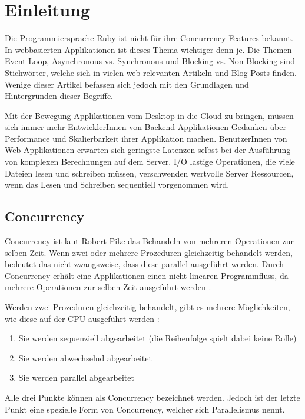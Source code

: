 \section{Einleitung}
\label{section:Einleitung}

Die Programmiersprache Ruby ist nicht für ihre Concurrency Features bekannt. In webbasierten Applikationen ist dieses Thema wichtiger denn je. Die Themen Event Loop, Asynchronous vs. Synchronous und Blocking vs. Non-Blocking sind Stichwörter, welche sich in vielen web-relevanten Artikeln und Blog Posts finden. Wenige dieser Artikel befassen sich jedoch mit den Grundlagen und Hintergründen dieser Begriffe. 

Mit der Bewegung Applikationen vom Desktop in die Cloud zu bringen, müssen sich immer mehr EntwicklerInnen von Backend Applikationen Gedanken über Performance und Skalierbarkeit ihrer Applikation machen. BenutzerInnen von Web-Applikationen erwarten sich geringste Latenzen selbst bei der Ausführung von komplexen Berechnungen auf dem Server. I/O lastige Operationen, die viele Dateien lesen und schreiben müssen, verschwenden wertvolle Server Ressourcen, wenn das Lesen und Schreiben sequentiell vorgenommen wird. 

\subsection{Concurrency}
\label{section:concurrency}

Concurrency ist laut Robert Pike das Behandeln von mehreren Operationen zur selben Zeit. Wenn zwei oder mehrere Prozeduren gleichzeitig behandelt werden, bedeutet das nicht zwangsweise, dass diese parallel ausgeführt werden. Durch Concurrency erhält eine Applikationen einen nicht linearen Programmfluss, da mehrere Operationen zur selben Zeit ausgeführt werden \cite[]{Pik2013}.

Werden zwei Prozeduren gleichzeitig behandelt, gibt es mehrere Möglichkeiten, wie diese auf der CPU ausgeführt werden \cite[p. 14]{Erb2012}:

\begin{enumerate}
  \item Sie werden sequenziell abgearbeitet (die Reihenfolge spielt dabei keine Rolle)
  \item Sie werden abwechselnd abgearbeitet
  \item Sie werden parallel abgearbeitet
\end{enumerate}

Alle drei Punkte können als Concurrency bezeichnet werden. Jedoch ist der letzte Punkt eine spezielle Form von Concurrency, welcher sich Parallelismus nennt. 

